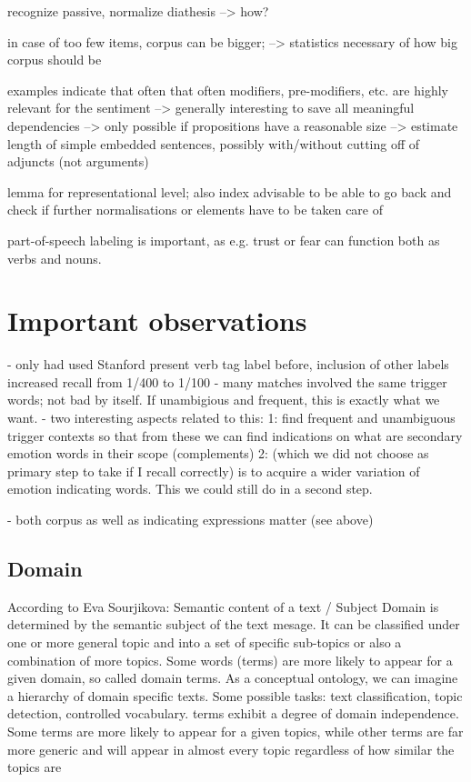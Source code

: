 recognize passive, normalize diathesis --> how?

in case of too few items, corpus can be bigger; 
--> statistics necessary of how big corpus should be

examples indicate that often that often modifiers, pre-modifiers, etc. are highly relevant for the sentiment
--> generally interesting to save all meaningful dependencies
--> only possible if propositions have a reasonable size
--> estimate length of simple embedded sentences, possibly with/without cutting off of adjuncts (not arguments)

lemma for representational level; also index advisable to be able to go back and check if further normalisations or elements have to be taken care of

part-of-speech labeling is important, as e.g. trust or fear can function both as verbs and nouns.


\section{Important observations}

- only had used Stanford present verb tag label before, inclusion of other labels increased recall from 1/400 to 1/100
- many matches involved the same trigger words; not bad by itself. If unambigious and frequent, this is exactly what we want.
- two interesting aspects related to this:
1: find frequent and unambiguous trigger contexts so that from these we can find indications on what are secondary emotion words in their scope (complements)
2: (which we did not choose as primary step to take if I recall correctly) is to acquire a wider variation of emotion indicating words. This we could still do in a second step.

- both corpus as well as indicating expressions matter (see above)

\subsection{Domain}

According to Eva Sourjikova:
Semantic content of a text / Subject
Domain is determined by the semantic subject of the text mesage. It can be classified under one
or more general topic and into a set of specific sub-topics or also a combination of more topics.
Some words (terms) are more likely to appear for a given domain, so called domain terms. As
a conceptual ontology, we can imagine a hierarchy of domain specific texts. Some possible tasks:
text classification, topic detection, controlled vocabulary. terms exhibit a degree of domain independence. Some terms are more likely to appear for a given topics, while other terms are far more
generic and will appear in almost every topic regardless of how similar the topics are


